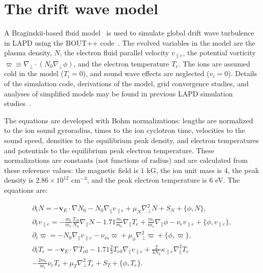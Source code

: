 \documentclass[showpacs,preprintnumbers,amsmath,amssymb,superscriptaddress,aip]{revtex4-1}
\def\beqar{\begin{eqnarray}}
\def\eeqar{\end{eqnarray}}
\newcommand{\pdt}{\partial_t}
\def\grad{\nabla}
\newcommand{\gradpar}{\grad_\parallel}
\newcommand{\gradperp}{\grad_\perp}
\newcommand{\vpe}{v_{\parallel e}}
\newcommand{\nue}{\nu_{e}}
\newcommand{\nuin}{\nu_{in}}
\newcommand{\kpe}{\kappa_{\parallel e}}
\newcommand{\fmie}{\frac{m_i}{m_e}}
\begin{document}
\section{The drift wave model}
\label{dw_model}

A Braginskii-based fluid model~\cite{Braginskii1965} is used to simulate global drift wave turbulence in LAPD using the BOUT++ code~\cite{dudson2009}. 
The evolved variables in the model are the plasma density, $N$, the electron fluid parallel velocity $\vpe$, the potential vorticity $\varpi \equiv \gradperp \cdot (N_0 \gradperp \phi)$,
and the electron temperature $T_e$. The ions are assumed cold in the
model ($T_i = 0$), and sound wave effects are neglected ($v_i = 0$). Details of the simulation code, derivations of the model, grid convergence studies, and analyses of simplified models
may be found in previous LAPD simulation studies~\cite{Popovich2010a,Popovich2010b,Umansky2011,friedman2012,friedman2012b}.

The equations are developed with Bohm normalizations: lengths are
normalized to the ion sound gyroradius, times to the ion
cyclotron time, velocities to the sound speed, densities to the equilibrium peak density, and electron
temperatures and potentials to the equilibrium peak electron temperature. These normalizations are constants (not functions of radius) and are calculated from these reference values:
the magnetic field is $1$ kG, the ion unit mass is $4$, the peak density is $2.86 \times 10^{12}$ cm$^{-3}$, and the peak electron temperature
is $6$ eV. The equations are:

\beqar
\label{ni_eq}
\pdt N = - {\mathbf v_E} \cdot \grad N_0 - N_0 \gradpar \vpe + \mu_N \gradperp^2 N + S_N + \{\phi,N\}, \\
\label{ve_eq}
\pdt \vpe = - \fmie \frac{T_{e0}}{N_0} \gradpar N - 1.71 \fmie \gradpar T_e  + \fmie \gradpar \phi - \nue \vpe + \{\phi,\vpe \}, \\
\label{rho_eq}
\pdt \varpi = - N_0 \gradpar \vpe  - \nuin \varpi + \mu_\phi \gradperp^2 \varpi + \{\phi,\varpi \}, \\
\label{te_eq}
\pdt T_e = - {\mathbf v_E} \cdot \grad T_{e0} - 1.71 \frac{2}{3} T_{e0} \gradpar \vpe + \frac{2}{3 N_0} \kpe \gradpar^2 T_e  \nonumber \\
- \frac{2 m_e}{m_i} \nue T_e  + \mu_T \gradperp^2 T_e +  S_T + \{\phi,T_e\}.
\eeqar
\end{document}
